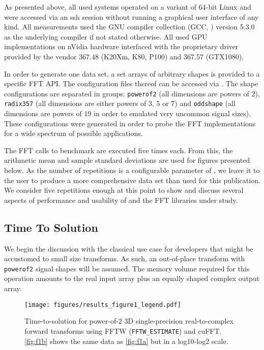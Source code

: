 As presented above, all used systems operated on a variant of 64-bit Linux and were accessed via an ssh session without running a graphical user interface of any kind. All measurements used the GNU compiler collection (GCC, \cite{stallman2001using}) version 5.3.0 as the underlying compiler if not stated otherwise. All used GPU implementations on nVidia hardware interfaced with the proprietary driver provided by the vendor $367.48$ (K20Xm, K80, P100) and $367.57$ (GTX1080). 

In order to generate one data set, a set arrays of arbitrary shapes is provided to a specific FFT API. The configuration files thereof can be accessed via \cite{gearshifft_github}. The shape configurations are separated in groups: \texttt{powerof2} (all dimensions are powers of $2$), \texttt{radix357} (all dimensions are either powers of $3$, $5$ or $7$) and \texttt{oddshape} (all dimensions are powers of $19$ in order to emulated very uncommon signal sizes). These configurations were generated in order to probe the FFT implementations for a wide spectrum of possible applications.  

The FFT calls to benchmark are executed five times each. From this, the arithmetic mean and sample standard deviations are used for figures presented below. As the number of repetitions is a configurable parameter of \gearshifft{}, we leave it to the user to produce a more comprehensive data set than used for this publication. We consider five repetitions enough at this point to show and discuss several aspects of performance and usability of \gearshifft{} and the FFT libraries under study.  


\subsection{Time To Solution}
\label{ssec:tts}

We begin the discussion with the classical use case for developers that might be accustomed to small size transforms. As such, an out-of-place transform with \texttt{powerof2} signal shapes will be assumed. The memory volume required for this operation amounts to the real input array plus an equally shaped complex output array.   

\begin{figure}[!tbp]
  \centering
  \texttt{[image: figures/results\_figure1\_legend.pdf]}
  \hfill
  \caption{Time-to-solution for power-of-2 3D single-precision real-to-complex forward transforms using FFTW (\texttt{FFTW\_ESTIMATE}) and cuFFT. \cref{fig:f1b} shows the same data as \cref{fig:f1a} but in a log10-log2 scale.}
  \label{fig:tts}
\end{figure}


